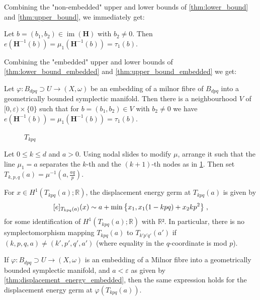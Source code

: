 \documentclass[12pt,a4paper,draft]{scrartcl}
\DeclareMathOperator{\im}{im}
\begin{document}
Combining the "non-embedded" upper and lower bounds of \cref{thm:lower_bound} and \cref{thm:upper_bound}, we immediately get:

\begin{theorem}
  \label{thm:displacement_energy}
  Let $b=(b_1,b_2) ∈ \im(\symbf{H})$ with $b_2 ≠ 0$. Then $e(\symbf{H}^{-1}(b)) = μ_1(\symbf{H}^{-1}(b)) = τ_1(b)$.
\end{theorem}

Combining the "embedded" upper and lower bounds of \cref{thm:lower_bound_embedded} and \cref{thm:upper_bound_embedded} we get:

\begin{theorem}
  \label{thm:displacement_energy_embedded}
  Let $φ \colon B_{dpq} ⊃ U → (X,ω)$ be an embedding of a milnor fibre of $B_{dpq}$ into a geometrically bounded symplectic manifold. Then there is a neighbourhood $V$ of $[0,ε) × \{0\}$ such that for $b = (b_1,b_2) ∈ V$ with $b_2 ≠ 0$ we have $e(\symbf{H}^{-1}(b)) = μ_1(\symbf{H}^{-1}(b)) = τ_1(b)$.
\end{theorem}

\begin{figure}
  \centering
  \caption{$T_{kpq}$}
  \label{fig:tkpq_def}
\end{figure}

\begin{definition}
  Let $0 ≤ k ≤ d$ and $a>0$.
  Using nodal slides to modify $μ$, arrange it such that the line $μ_1 = a$ separates the $k$-th and the $(k+1)$-th nodes as in \cref{fig:tkpq_def}.
  Then set $T_{k,p,q}(a) = μ^{-1}(a,\frac{aq}{p})$.
\end{definition}

\begin{theorem}
  \label{thm:main}

  For $x ∈ H^1(T_{kpq}(a); ℝ)$, the displacement energy germ at $T_{kpq}(a)$ is given by
  \[ [e]_{T_{kpq}(a)} (x) \sim a + \min\qty{x_1, x_1 (1-kpq) + x_2 k p^2} \; , \]
  for some identification of $H^1(T_{kpq}(a);ℝ)$ with $ℝ²$.
  In particular, there is no symplectomorphism mapping $T_{kpq}(a)$ to $T_{k'p'q'}(a')$ if $(k,p,q,a) ≠ (k',p',q',a')$ (where equality in the $q$-coordinate is mod $p$).

  If $φ \colon B_{dpq} ⊃ U → (X,ω)$ is an embedding of a Milnor fibre into a geometrically bounded symplectic manifold, and $a<ε$ as given by \cref{thm:displacement_energy_embedded}, then the same expression holds for the displacement energy germ at $φ(T_{kpq}(a))$.
\end{theorem}
\end{document}
